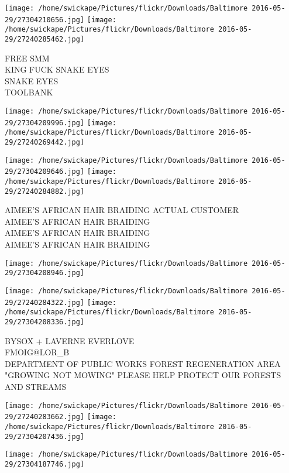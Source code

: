\documentclass[10pt,letterpaper]{article}
\begin{document}
\texttt{[image: /home/swickape/Pictures/flickr/Downloads/Baltimore 2016-05-29/27304210656.jpg]}
\texttt{[image: /home/swickape/Pictures/flickr/Downloads/Baltimore 2016-05-29/27240285462.jpg]}

FREE SMM\\
KING FUCK SNAKE EYES\\
SNAKE EYES\\
TOOLBANK\\
\pagebreak

\texttt{[image: /home/swickape/Pictures/flickr/Downloads/Baltimore 2016-05-29/27304209996.jpg]}
\texttt{[image: /home/swickape/Pictures/flickr/Downloads/Baltimore 2016-05-29/27240269442.jpg]}

\texttt{[image: /home/swickape/Pictures/flickr/Downloads/Baltimore 2016-05-29/27304209646.jpg]}
\texttt{[image: /home/swickape/Pictures/flickr/Downloads/Baltimore 2016-05-29/27240284882.jpg]}

AIMEE'S AFRICAN HAIR BRAIDING ACTUAL CUSTOMER\\
AIMEE'S AFRICAN HAIR BRAIDING\\
AIMEE'S AFRICAN HAIR BRAIDING\\
AIMEE'S AFRICAN HAIR BRAIDING\\
\pagebreak

\texttt{[image: /home/swickape/Pictures/flickr/Downloads/Baltimore 2016-05-29/27304208946.jpg]}

\vspace{0.25in}
\texttt{[image: /home/swickape/Pictures/flickr/Downloads/Baltimore 2016-05-29/27240284322.jpg]}
\texttt{[image: /home/swickape/Pictures/flickr/Downloads/Baltimore 2016-05-29/27304208336.jpg]}

BYSOX + LAVERNE EVERLOVE\\
FMOIG@LOR\_B\\
DEPARTMENT OF PUBLIC WORKS FOREST REGENERATION AREA "GROWING NOT MOWING" PLEASE HELP PROTECT OUR FORESTS AND STREAMS\\
\pagebreak

\texttt{[image: /home/swickape/Pictures/flickr/Downloads/Baltimore 2016-05-29/27240283662.jpg]}
\texttt{[image: /home/swickape/Pictures/flickr/Downloads/Baltimore 2016-05-29/27304207436.jpg]}

\vspace{0.25in}
\texttt{[image: /home/swickape/Pictures/flickr/Downloads/Baltimore 2016-05-29/27304187746.jpg]}
\end{document}
